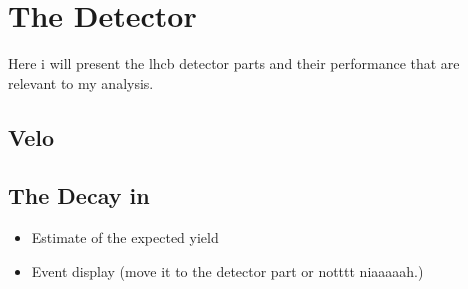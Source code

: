 
\chapter{The \lhcb Detector}
\label{The_lhcb_Det}

Here i will present the lhcb detector parts and their performance that are relevant to my analysis.

\section{Velo}

\section{The \BJpsiKst Decay in \lhcb}

\begin{itemize}

\item Estimate of the expected yield
  \item Event display (move it to the detector part or notttt niaaaaah.)

\end{itemize}
